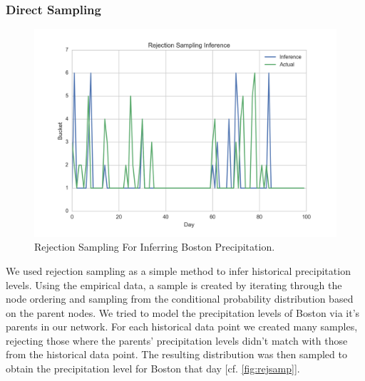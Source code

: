 \documentclass{article}
\begin{document}
\subsubsection{Direct Sampling}
\begin{figure}
\centering
\includegraphics[scale=0.5]{../images/rej_samp.png}
\caption{Rejection Sampling For Inferring Boston Precipitation.}
\label{fig:rejsamp}
\end{figure}

We used rejection sampling as a simple method to infer historical precipitation levels. Using the empirical data, a sample is created by iterating through the node ordering and sampling from the conditional probability distribution based on the parent nodes. We tried to model the precipitation levels of Boston via it's parents in our network. For each historical data point we created many samples, rejecting those where the parents' precipitation levels didn't match with those from the historical data point. The resulting distribution was then sampled to obtain the precipitation level for Boston that day [cf. \autoref{fig:rejsamp}].
\end{document}
